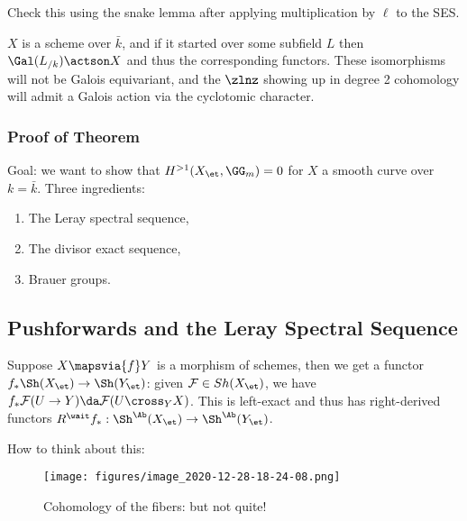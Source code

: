 \begin{exercise}[?]

Check this using the snake lemma after applying multiplication by
\(\ell\) to the SES.

\end{exercise}

\begin{remark}

\(X\) is a scheme over \(\bar k\), and if it started over some subfield
\(L\) then \(\Gal(L_{/k}) \actson X\) and thus the corresponding
functors. These isomorphisms will not be Galois equivariant, and the
\(\zlnz\) showing up in degree 2 cohomology will admit a Galois action
via the cyclotomic character.

\end{remark}

\hypertarget{proof-of-theorem-2}{%
\subsubsection{Proof of Theorem}\label{proof-of-theorem-2}}

Goal: we want to show that \(H^{>1}(X_\et, \GG_m) = 0\) for \(X\) a
smooth curve over \(k=\bar k\). Three ingredients:

\begin{enumerate}
\def\labelenumi{\arabic{enumi}.}
\item
  The Leray spectral sequence,
\item
  The divisor exact sequence,
\item
  Brauer groups.
\end{enumerate}

\hypertarget{pushforwards-and-the-leray-spectral-sequence}{%
\subsection{Pushforwards and the Leray Spectral
Sequence}\label{pushforwards-and-the-leray-spectral-sequence}}

Suppose \(X\mapsvia{f} Y\) is a morphism of schemes, then we get a
functor \(f_* \Sh(X_\et) \to \Sh(Y_\et)\): given
\(\mathcal{F}\in Sh(X_\et)\), we have
\(f_* \mathcal{F}(U\to Y) \da \mathcal{F}(U\cross_Y X)\). This is
left-exact and thus has right-derived functors
\(R^\wait f_*:\Sh^\Ab(X_\et) \to \Sh^\Ab(Y_\et)\).

How to think about this:

\begin{figure}
\centering
\texttt{[image: figures/image\_2020-12-28-18-24-08.png]}
\caption{Cohomology of the fibers: but not quite!}
\end{figure}

